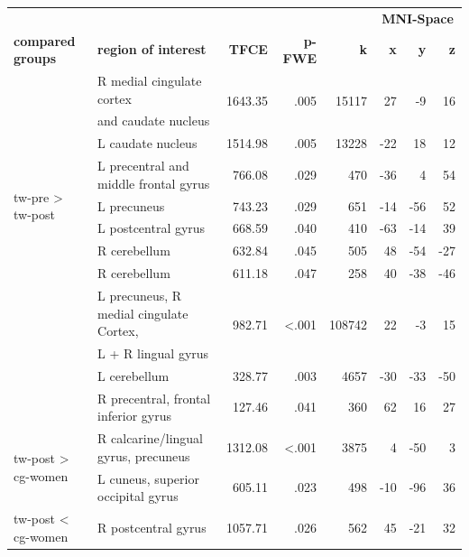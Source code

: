 \documentclass{article}
\begin{document}
    \begin{table}
        \centering

        \begin{tabular}{l|lrrrrrr}
            \multicolumn{1}{c}{}& & & & & \multicolumn{3}{c}{\textbf{MNI-Space}} \\ \cmidrule(lr){6-8}
            \textbf{compared groups} & \textbf{region of interest} & \textbf{TFCE} & \textbf{p-FWE} & \textbf{k} & \textbf{x} & \textbf{y} & \textbf{z} \\ \hline
            \multirow{9}{*}{\ac{tw}-pre > \ac{tw}-post} & R medial cingulate cortex & \multirow{2}{*}{1643.35} & \multirow{2}{*}{.005} & \multirow{2}{*}{15117} & \multirow{2}{*}{27} & \multirow{2}{*}{-9} & \multirow{2}{*}{16} \\
            & and caudate nucleus \\
            & L caudate nucleus & 1514.98 & .005 & 13228 & -22 & 18 & 12 \\
            & L precentral and middle frontal gyrus & 766.08 & .029 & 470 & -36 & 4 & 54 \\
            & L precuneus & 743.23 & .029 & 651 & -14 & -56 & 52 \\
            & L postcentral gyrus & 668.59 & .040 & 410 & -63 & -14 & 39 \\
            & R cerebellum & 632.84 & .045 & 505 & 48 & -54 & -27 \\
            & R cerebellum & 611.18 & .047 & 258 & 40 & -38 & -46 \\ \hline
            \multirow{4}{*}{\ac{tw}-pre > \ac{cg}-women} & L precuneus, R medial cingulate Cortex, & \multirow{2}{*}{982.71} & \multirow{2}{*}{<.001} & \multirow{2}{*}{108742} & \multirow{2}{*}{22} & \multirow{2}{*}{-3} & \multirow{2}{*}{15} \\
            & L + R lingual gyrus \\
            & L cerebellum & 328.77 & .003 & 4657 & -30 & -33 & -50 \\
            & R precentral, frontal inferior gyrus & 127.46 & .041 & 360 & 62 & 16 & 27 \\ \hline
            \multirow{2}{*}{\ac{tw}-post > \ac{cg}-women} & R calcarine/lingual gyrus, precuneus & 1312.08 & <.001 & 3875 & 4 & -50 & 3 \\
            & L cuneus, superior occipital gyrus & 605.11 & .023 & 498 & -10 & -96 & 36 \\
            \ac{tw}-post < \ac{cg}-women & R postcentral gyrus & 1057.71 & .026 & 562 & 45 & -21 & 32 \\ \hline

\end{tabular}
\end{table}
\end{document}
